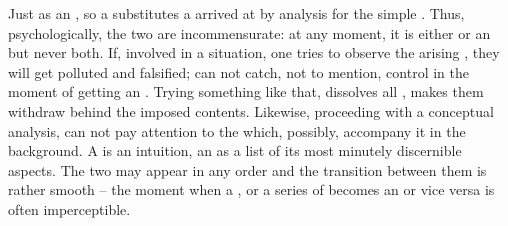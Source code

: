 \pa Just as an  , so a
 substitutes a  arrived at by analysis
for the simple .  Thus, 
psychologically, the two are incommensurate: at any  moment, it is
either  or an  but never both. If, involved in a
situation, one tries to observe the arising , they will get
polluted and falsified;  can not  catch, not to mention,
control  in the moment of getting an . Trying
something like that, dissolves all , makes them withdraw
behind the imposed  contents. Likewise, proceeding with a
conceptual analysis,  can not pay attention to the  which,
possibly, accompany it in the background.  A  is an
 intuition, an   as a list of
its most minutely discernible aspects. The two may appear in any order and the
transition between them is rather smooth -- the moment when a , or a
series of  becomes an  or vice versa is often
imperceptible.

